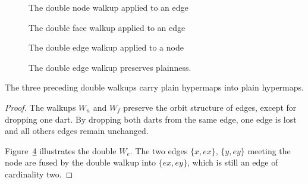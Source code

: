 \begin{figure}[htb]
\centering
{}
\caption{The double node walkup applied to an edge}
\label{fig:doublenode}
\end{figure}


\begin{figure}[htb]
\centering
{}
\caption{The double face walkup applied to an edge}
\label{fig:doubleface}
\end{figure}


\begin{figure}[htb]
\centering
{}
\caption{The double edge walkup applied to a node}
\label{fig:doubleedge}
\end{figure}

\begin{figure}[htb]
\centering
{}
\caption{The double edge walkup preserves plainness.}
\label{fig:doubleplain}
\end{figure}


\begin{lemma}\label{lemma:dwalk-planar}  
The three preceding double walkups carry plain
hypermaps into plain hypermaps.
\end{lemma}
%

\begin{proof} The walkups $W_n$ and $W_f$ preserve the orbit structure
  of edges, except for dropping one dart.  By dropping both darts from
  the same edge, one edge is lost and all others edges remain
  unchanged.

  Figure~\ref{fig:doubleplain} illustrates the double $W_e$.  The two
  edges $\{x,e x\}$, $\{y, e y\}$ meeting the node are fused by the
  double walkup into $\{e x, e y\}$, which is still an edge of cardinality
  two.
\end{proof}

